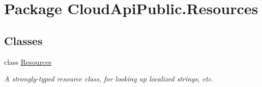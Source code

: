 \hypertarget{namespace_cloud_api_public_1_1_resources}{\section{Package Cloud\-Api\-Public.\-Resources}
\label{namespace_cloud_api_public_1_1_resources}
}
\subsection*{Classes}
\begin{DoxyCompactItemize}
\item 
class \hyperlink{class_cloud_api_public_1_1_resources_1_1_resources}{Resources}
\begin{DoxyCompactList}\small\item\em A strongly-\/typed resource class, for looking up localized strings, etc. \end{DoxyCompactList}\end{DoxyCompactItemize}
